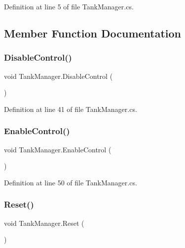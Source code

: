 Definition at line 5 of file Tank\+Manager.\+cs.



\subsection{Member Function Documentation}
\mbox{\label{class_tank_manager_a215f539b28fcd32c07f831a28533386d}} 
\subsubsection{\texorpdfstring{Disable\+Control()}{DisableControl()}}
{\footnotesize\ttfamily void Tank\+Manager.\+Disable\+Control (\begin{DoxyParamCaption}{ }\end{DoxyParamCaption})}



Definition at line 41 of file Tank\+Manager.\+cs.

\mbox{\label{class_tank_manager_ad904353e6e7eeeaf9bde2092b1e87b66}} 
\subsubsection{\texorpdfstring{Enable\+Control()}{EnableControl()}}
{\footnotesize\ttfamily void Tank\+Manager.\+Enable\+Control (\begin{DoxyParamCaption}{ }\end{DoxyParamCaption})}



Definition at line 50 of file Tank\+Manager.\+cs.

\mbox{\label{class_tank_manager_a89675bc32c6dd907f68f7421a7c6e8e2}} 
\subsubsection{\texorpdfstring{Reset()}{Reset()}}
{\footnotesize\ttfamily void Tank\+Manager.\+Reset (\begin{DoxyParamCaption}{ }\end{DoxyParamCaption})}



